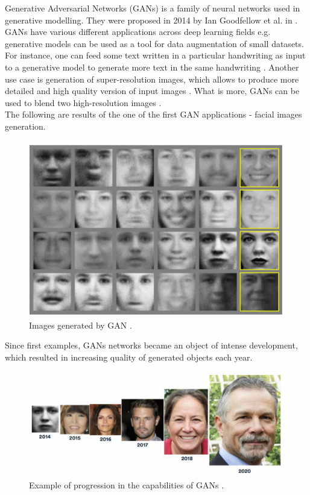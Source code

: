 \documentclass[12pt,a4paper,openany]{book}
\begin{document}
\noindent Generative Adversarial Networks (GANs) is a family of neural networks used in generative modelling. They were proposed in 2014 by Ian Goodfellow et al. in \cite{gan}.\\
\noindent GANs have various different applications across deep learning fields e.g. generative models can be used as a tool for data augmentation of small datasets. For instance, one can feed some text written in a particular handwriting as input to a generative model to generate more text in the same handwriting \cite{hand}. Another use case is generation of super-resolution images, which allows to produce more detailed and high quality version of input images \cite{superres}.  What is more, GANs can be used to blend two high-resolution images \cite{blend}. \\
The following are results of the one of the first GAN applications - facial images generation.
 \begin{figure}[ht!]
     \centering
     \includegraphics[scale=0.4]{figs/faces.png}
     \caption{Images generated by GAN \cite{gan}.}
 \end{figure}
 
 \newpage
\noindent Since first examples, GANs networks became an object of intense development, which resulted in increasing quality of generated objects each year.

 \begin{figure}[ht!]
     \centering
     \includegraphics[scale=0.8]{figs/gans_progress_new.PNG}
     \caption{Example of progression in the capabilities of GANs \cite{progress_gan}. }
 \end{figure}
 
\end{document}
